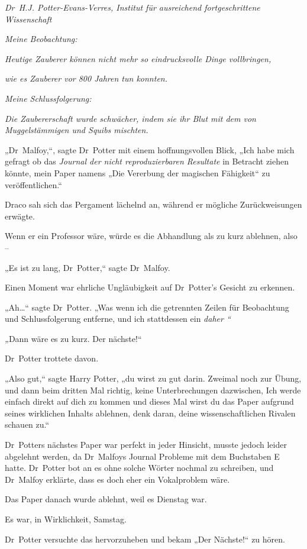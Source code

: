 {\emph{Dr~H.J. Potter-Evans-Verres, Institut für ausreichend fortgeschrittene Wissenschaft}

\emph{Meine Beobachtung:}

\emph{Heutige Zauberer können nicht mehr so eindrucksvolle Dinge vollbringen,}

\emph{wie es Zauberer vor 800 Jahren tun konnten.}

\emph{Meine Schlussfolgerung:}

\emph{Die Zaubererschaft wurde schwächer, indem sie ihr Blut mit dem von Muggelstämmigen und Squibs mischten.}

„Dr~Malfoy,“, sagte Dr~Potter mit einem hoffnungsvollen Blick, „Ich habe mich gefragt ob das \emph{Journal der nicht reproduzierbaren Resultate} in Betracht ziehen könnte, mein Paper namens „Die Vererbung der magischen Fähigkeit“ zu veröffentlichen.“

Draco sah sich das Pergament lächelnd an, während er mögliche Zurückweisungen erwägte.

Wenn er ein Professor wäre, würde es die Abhandlung als zu kurz ablehnen, also --

„Es ist zu lang, Dr~Potter,“ sagte Dr~Malfoy.

Einen Moment war ehrliche Ungläubigkeit auf Dr~Potter's Gesicht zu erkennen.

„Ah…“ sagte Dr~Potter. „Was wenn ich die getrennten Zeilen für Beobachtung und Schlussfolgerung entferne, und ich stattdessen ein \emph{daher \later“}

\emph{„}Dann wäre es zu kurz. Der nächste!“

Dr~Potter trottete davon.

„Also gut,“ sagte Harry Potter, „du wirst zu gut darin. Zweimal noch zur Übung, und dann beim dritten Mal richtig, keine Unterbrechungen dazwischen, Ich werde einfach direkt auf dich zu kommen und dieses Mal wirst du das Paper aufgrund seines wirklichen Inhalts ablehnen, denk daran, deine wissenschaftlichen Rivalen schauen zu.“

Dr~Potters nächstes Paper war perfekt in jeder Hinsicht, musste jedoch leider abgelehnt werden, da Dr~Malfoys Journal Probleme mit dem Buchstaben E hatte. Dr~Potter bot an es ohne solche Wörter nochmal zu schreiben, und Dr~Malfoy erklärte, dass es doch eher ein Vokalproblem wäre.

Das Paper danach wurde ablehnt, weil es Dienstag war.

Es war, in Wirklichkeit, Samstag.

Dr~Potter versuchte das hervorzuheben und bekam „Der Nächste!“ zu hören.

}
